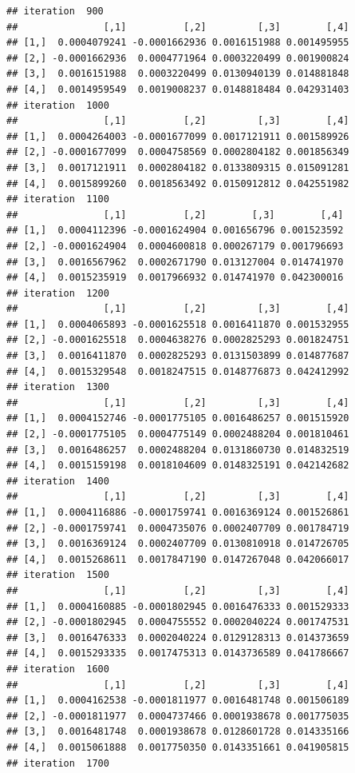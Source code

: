 \documentclass[
]{article}
\begin{document}
\begin{verbatim}
## iteration  900 
##               [,1]          [,2]         [,3]        [,4]
## [1,]  0.0004079241 -0.0001662936 0.0016151988 0.001495955
## [2,] -0.0001662936  0.0004771964 0.0003220499 0.001900824
## [3,]  0.0016151988  0.0003220499 0.0130940139 0.014881848
## [4,]  0.0014959549  0.0019008237 0.0148818484 0.042931403
## iteration  1000 
##               [,1]          [,2]         [,3]        [,4]
## [1,]  0.0004264003 -0.0001677099 0.0017121911 0.001589926
## [2,] -0.0001677099  0.0004758569 0.0002804182 0.001856349
## [3,]  0.0017121911  0.0002804182 0.0133809315 0.015091281
## [4,]  0.0015899260  0.0018563492 0.0150912812 0.042551982
## iteration  1100 
##               [,1]          [,2]        [,3]        [,4]
## [1,]  0.0004112396 -0.0001624904 0.001656796 0.001523592
## [2,] -0.0001624904  0.0004600818 0.000267179 0.001796693
## [3,]  0.0016567962  0.0002671790 0.013127004 0.014741970
## [4,]  0.0015235919  0.0017966932 0.014741970 0.042300016
## iteration  1200 
##               [,1]          [,2]         [,3]        [,4]
## [1,]  0.0004065893 -0.0001625518 0.0016411870 0.001532955
## [2,] -0.0001625518  0.0004638276 0.0002825293 0.001824751
## [3,]  0.0016411870  0.0002825293 0.0131503899 0.014877687
## [4,]  0.0015329548  0.0018247515 0.0148776873 0.042412992
## iteration  1300 
##               [,1]          [,2]         [,3]        [,4]
## [1,]  0.0004152746 -0.0001775105 0.0016486257 0.001515920
## [2,] -0.0001775105  0.0004775149 0.0002488204 0.001810461
## [3,]  0.0016486257  0.0002488204 0.0131860730 0.014832519
## [4,]  0.0015159198  0.0018104609 0.0148325191 0.042142682
## iteration  1400 
##               [,1]          [,2]         [,3]        [,4]
## [1,]  0.0004116886 -0.0001759741 0.0016369124 0.001526861
## [2,] -0.0001759741  0.0004735076 0.0002407709 0.001784719
## [3,]  0.0016369124  0.0002407709 0.0130810918 0.014726705
## [4,]  0.0015268611  0.0017847190 0.0147267048 0.042066017
## iteration  1500 
##               [,1]          [,2]         [,3]        [,4]
## [1,]  0.0004160885 -0.0001802945 0.0016476333 0.001529333
## [2,] -0.0001802945  0.0004755552 0.0002040224 0.001747531
## [3,]  0.0016476333  0.0002040224 0.0129128313 0.014373659
## [4,]  0.0015293335  0.0017475313 0.0143736589 0.041786667
## iteration  1600 
##               [,1]          [,2]         [,3]        [,4]
## [1,]  0.0004162538 -0.0001811977 0.0016481748 0.001506189
## [2,] -0.0001811977  0.0004737466 0.0001938678 0.001775035
## [3,]  0.0016481748  0.0001938678 0.0128601728 0.014335166
## [4,]  0.0015061888  0.0017750350 0.0143351661 0.041905815
## iteration  1700 

\end{verbatim}
\end{document}
